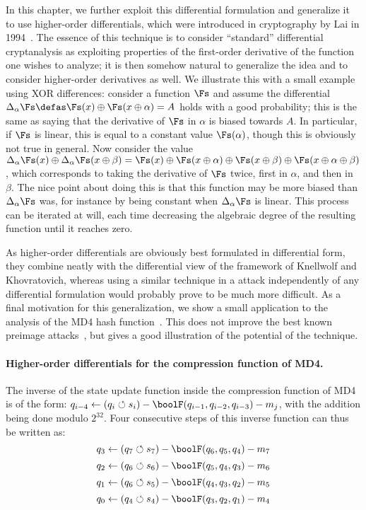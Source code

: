 In this chapter, we further exploit this differential formulation and generalize it to use higher-order
differentials, which were introduced in cryptography by Lai in 1994~\cite{L94}. The essence
of this technique is to consider ``standard'' differential cryptanalysis as exploiting properties
of the first-order derivative of the function one wishes to analyze; it is then somehow natural
to generalize the idea and to consider higher-order derivatives as well. We illustrate this
with a small example using XOR differences: consider a function $\Fs$ and
assume the differential $\Delta_\alpha\Fs \defas \Fs(x) \oplus \Fs(x \oplus \alpha) = A$ holds with a good probability; this
is the same as saying that the derivative of $\Fs$ in $\alpha$ is biased towards $A$. In particular,
if $\Fs$ is linear, this is equal to a constant value $\Fs(\alpha)$, though this is obviously not
true in general. Now consider the value $\Delta_\alpha\Fs(x) \oplus \Delta_\alpha\Fs(x \oplus \beta) =
\Fs(x) \oplus \Fs(x \oplus \alpha) \oplus \Fs(x \oplus \beta)
\oplus \Fs(x \oplus \alpha \oplus \beta)$, which corresponds to taking the derivative of $\Fs$ twice,
first
in $\alpha$, and then in $\beta$. The nice point about doing this is that this function may be more
biased than $\Delta_\alpha\Fs$ was, for instance by being constant when $\Delta_\alpha\Fs$ is linear.
This process can be iterated at will, each time decreasing the algebraic degree of the resulting
function until it reaches zero.

As higher-order differentials are obviously best formulated in differential form,
they combine neatly with the differential view of the framework of Knellwolf and Khovratovich, whereas
using a similar technique in a \mitm attack independently of any differential formulation would probably prove to be
much more difficult.
As a final motivation for this generalization, we show a small application to
the analysis of the MD4 hash function~\cite{Rivest-md4}. This does not improve the best known
preimage attacks~\cite{md4p2,md4p3}, but gives a good illustration of the potential of the technique.

\paragraph{Higher-order differentials for the compression function of MD4.}

The inverse of the state update function inside the compression function of MD4 is of
the form: $q_{i-4} \leftarrow (q_i \circlearrowleft s_i) - \boolF(q_{i-1}, q_{i-2}, q_{i-3}) - m_j$,
with
the addition being done modulo $2^{32}$.
Four consecutive steps of this inverse function can thus be written as:
\[
q_3 \leftarrow (q_7 \circlearrowleft s_7) - \boolF(q_6, q_5, q_4) - m_7
\]
\[
q_2 \leftarrow (q_6 \circlearrowleft s_6) - \boolF(q_5, q_4, q_3) - m_6
\]
\[
q_1 \leftarrow (q_6 \circlearrowleft s_5) - \boolF(q_4, q_3, q_2) - m_5
\]
\[
q_0 \leftarrow (q_4 \circlearrowleft s_4) - \boolF(q_3, q_2, q_1) - m_4
\]

